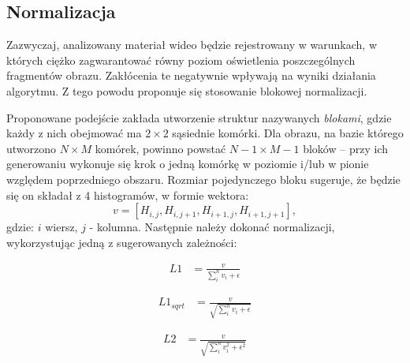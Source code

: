 \subsection{Normalizacja}

Zazwyczaj, analizowany materiał wideo będzie rejestrowany w warunkach, w których ciężko zagwarantować równy poziom oświetlenia poszczególnych fragmentów obrazu. %
Zakłócenia te negatywnie wpływają na wyniki działania algorytmu.
Z tego powodu proponuje się stosowanie blokowej normalizacji. 

Proponowane podejście zakłada utworzenie struktur nazywanych \textit{blokami}, gdzie każdy z nich obejmować ma $2\times 2$ sąsiednie komórki. 
Dla obrazu, na bazie którego utworzono $N \times M$ komórek, powinno powstać $N-1 \times M-1$ bloków -- przy ich generowaniu wykonuje się krok o jedną komórkę w poziomie i/lub w pionie względem poprzedniego obszaru. 
Rozmiar pojedynczego bloku sugeruje, że będzie się on składał z 4 histogramów, w formie wektora: 
\begin{equation}
v=[H_{i,j}, H_{i,j+1}, H_{i+1,j}, H_{i+1,j+1}],
\end{equation} 
gdzie: $i$  wiersz, $j$ - kolumna. Następnie należy dokonać normalizacji, wykorzystując jedną z sugerowanych zależności: %

\begin{equation}
\label{eq:HOG_norm1}
\left.\begin{aligned} 
L1&=\frac{v}{\sum_{i}^{n}v_i+\epsilon}
\end{aligned}\right.
\end{equation}

\begin{equation}
\label{eq:HOG_norm2}
\left.\begin{aligned} 
L1_{sqrt}&=\frac{v}{\sqrt{\sum_{i}^{n}v_i+\epsilon}}
\end{aligned}\right.
\end{equation}

\begin{equation}
\label{eq:HOG_norm3}
\left.\begin{aligned} 
L2&=\frac{v}{\sqrt{\sum_{i}^{n}v_i^2+\epsilon^2}}
\end{aligned}\right.
\end{equation}


